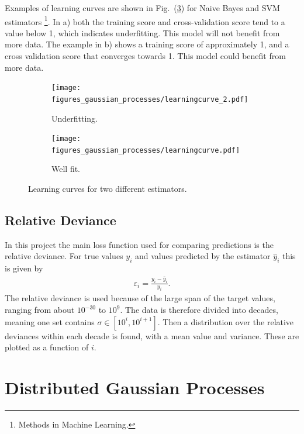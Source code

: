 \documentclass[twoside,english]{uiofysmaster}
\begin{document}
Examples of learning curves are shown in Fig.\ (\ref{Fig:: gaussian process : learning curves}) for Naive Bayes and SVM estimators \footnote{Methods in Machine Learning.}. In a) both the training score and cross-validation score tend to a value below 1, which indicates underfitting. This model will not benefit from more data. The example in b) shows a training score of approximately 1, and a cross validation score that converges towards 1. This model could benefit from more data.

\begin{figure}
    \centering
    \begin{subfigure}[b]{0.45\textwidth}
        \texttt{[image: figures\_gaussian\_processes/learningcurve\_2.pdf]}
        \caption{Underfitting.}
        \label{fig:gull}
    \end{subfigure}
    \begin{subfigure}[b]{0.45\textwidth}
        \texttt{[image: figures\_gaussian\_processes/learningcurve.pdf]}
        \caption{Well fit.}
        \label{fig:tiger}
    \end{subfigure}
\caption{Learning curves for two different estimators.}
\label{Fig:: gaussian process : learning curves}
\end{figure}



\subsection{Relative Deviance}

In this project the main loss function used for comparing predictions is the relative deviance. For true values $y_i$ and values predicted by the estimator $\hat{y}_i$ this is given by
\begin{align}
\varepsilon_i = \frac{y_i - \hat{y}_i}{y_i}.
\end{align} 
The relative deviance is used because of the large span of the target values, ranging from about $10^{-30}$ to $10^9$. The data is therefore divided into decades, meaning one set contains $\sigma \in [10^i, 10^{i+1}]$. Then a distribution over the relative deviances within each decade is found, with a mean value and variance. These are plotted as a function of $i$. 

\section{Distributed Gaussian Processes}
\end{document}
